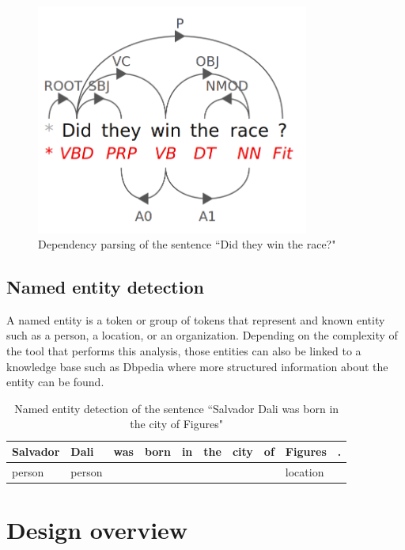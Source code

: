\documentclass{bsu-ms}
\begin{document}
\begin{figure}[h!]
\centering
\includegraphics[width=0.8\textwidth]{dependency}
\caption{Dependency parsing of the sentence ``Did they win the race?"}
\label{fig:dependency}
\end{figure}

\subsection{Named entity detection}
A named entity is a token or group of tokens that represent and known entity such as a person, a location, or an organization. Depending on the complexity of the tool that performs this analysis, those entities can also be linked to a knowledge base such as Dbpedia \cite{dbpedia} where more structured information about the entity can be found.




\begin{table}[h]
\centering
\begin{tabular}{|l|l|l|l|l|l|l|l|l|l|}
\hline
Salvador & Dali & was & born & in & the & city & of & Figures & . \\ \hline
person & person &   &   &   &   &  &  & location &   \\ \hline
\end{tabular}
\caption{Named entity detection of the sentence ``Salvador Dali was born in the city of Figures"}
\label{tab:postagging}
\end{table}


\section{Design overview}
\label{sec:overview}
\end{document}
